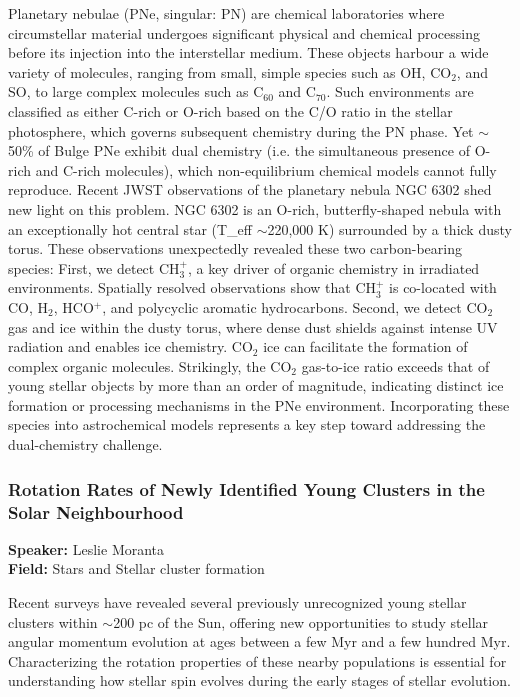 Planetary nebulae (PNe, singular: PN) are chemical laboratories where circumstellar material undergoes significant physical and chemical processing before its injection into the interstellar medium. These objects harbour a wide variety of molecules, ranging from small, simple species such as OH, CO$_2$, and SO, to large complex molecules such as C$_{60}$ and C$_{70}$. Such environments are classified as either C-rich or O-rich based on the C/O ratio in the stellar photosphere, which governs subsequent chemistry during the PN phase. Yet $\sim$50\% of Bulge PNe exhibit dual chemistry (i.e. the simultaneous presence of O-rich and C-rich molecules), which non-equilibrium chemical models cannot fully reproduce. Recent JWST observations of the planetary nebula NGC 6302 shed new light on this problem. NGC 6302 is an O-rich, butterfly-shaped nebula with an exceptionally hot central star (T\_eff $\sim$220,000 K) surrounded by a thick dusty torus. These observations unexpectedly revealed these two carbon-bearing species: First, we detect CH$_3^+$, a key driver of organic chemistry in irradiated environments. Spatially resolved observations show that CH$_3^+$ is co-located with CO, H$_2$, HCO$^+$, and polycyclic aromatic hydrocarbons. Second, we detect CO$_2$ gas and ice within the dusty torus, where dense dust shields against intense UV radiation and enables ice chemistry. CO$_2$ ice can facilitate the formation of complex organic molecules. Strikingly, the CO$_2$ gas-to-ice ratio exceeds that of young stellar objects by more than an order of magnitude, indicating distinct ice formation or processing mechanisms in the PNe environment. Incorporating these species into astrochemical models represents a key step toward addressing the dual-chemistry challenge.

\hypertarget{abstract-talk-223}{}\label{abstract-page-talk-223}
\subsubsection*{Rotation Rates of Newly Identified Young Clusters in the Solar Neighbourhood}
\textbf{Speaker:} Leslie Moranta\\
\textbf{Field:} Stars and Stellar cluster formation

Recent surveys have revealed several previously unrecognized young stellar clusters within $\sim$200 pc of the Sun, offering new opportunities to study stellar angular momentum evolution at ages between a few Myr and a few hundred Myr. Characterizing the rotation properties of these nearby populations is essential for understanding how stellar spin evolves during the early stages of stellar evolution.

